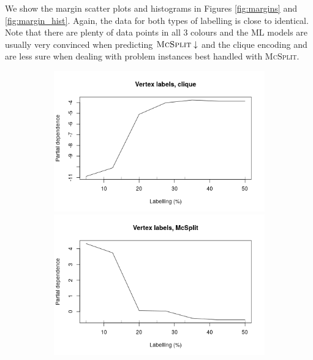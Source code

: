 \documentclass{l4proj}
\theoremstyle{definition}
\theoremstyle{remark}
\begin{document}
We show the margin scatter plots and histograms in Figures
\ref{fig:margins} and \ref{fig:margin_hist}. Again, the data for both types of
labelling is close to identical. Note that there are plenty of data points in
all 3 colours and the ML models are usually very convinced when predicting
$\textsc{McSplit}\downarrow$ and the clique encoding and are less sure when
dealing with problem instances best handled with \textsc{McSplit}.

\begin{figure}
  \centering
  \begin{subfigure}[t]{0.49\textwidth}
    \centering
    \includegraphics[width=\textwidth]{images/vertex_labels_clique_labelling.png}
    \includegraphics[width=\textwidth]{images/vertex_labels_mcsplit_labelling.png}

\end{subfigure}
\end{figure}
\end{document}
